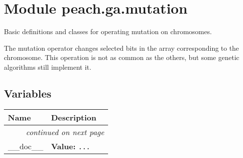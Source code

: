 %
%
%


\section{Module peach.ga.mutation}

    \label{peach:ga:mutation}

Basic definitions and classes for operating mutation on chromosomes.

The mutation operator changes selected bits in the array corresponding to the
chromosome. This operation is not as common as the others, but some genetic
algorithms still implement it.


  \subsection{Variables}

\begin{longtable}{|p{}|p{}|l}
\cline{1-2}
\cline{1-2} \centering \textbf{Name} & \centering \textbf{Description}& \\
\cline{1-2}
\endhead\cline{1-2}\multicolumn{3}{r}{\small\textit{continued on next page}}\\\endfoot\cline{1-2}
\endlastfoot\raggedright \_\-\_\-d\-o\-c\-\_\-\_\- & \raggedright \textbf{Value:} 
{\tt \texttt{...}}&\\
\cline{1-2}
\end{longtable}



